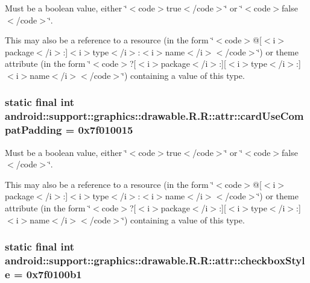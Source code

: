 Must be a boolean value, either \char`\"{}$<$code$>$true$<$/code$>$\char`\"{} or \char`\"{}$<$code$>$false$<$/code$>$\char`\"{}. 

This may also be a reference to a resource (in the form \char`\"{}$<$code$>$@\mbox{[}$<$i$>$package$<$/i$>$:\mbox{]}$<$i$>$type$<$/i$>$:$<$i$>$name$<$/i$>$$<$/code$>$\char`\"{}) or theme attribute (in the form \char`\"{}$<$code$>$?\mbox{[}$<$i$>$package$<$/i$>$:\mbox{]}\mbox{[}$<$i$>$type$<$/i$>$:\mbox{]}$<$i$>$name$<$/i$>$$<$/code$>$\char`\"{}) containing a value of this type. \hypertarget{classandroid_1_1support_1_1graphics_1_1drawable_1_1_r_1_1attr_37d1a1073e436afe463c3f31105a3f99}{
\subsubsection[{cardUseCompatPadding}]{\setlength{\rightskip}{0pt plus 5cm}static final int android::support::graphics::drawable.R.R::attr::cardUseCompatPadding = 0x7f010015}}
\label{classandroid_1_1support_1_1graphics_1_1drawable_1_1_r_1_1attr_37d1a1073e436afe463c3f31105a3f99}


Must be a boolean value, either \char`\"{}$<$code$>$true$<$/code$>$\char`\"{} or \char`\"{}$<$code$>$false$<$/code$>$\char`\"{}. 

This may also be a reference to a resource (in the form \char`\"{}$<$code$>$@\mbox{[}$<$i$>$package$<$/i$>$:\mbox{]}$<$i$>$type$<$/i$>$:$<$i$>$name$<$/i$>$$<$/code$>$\char`\"{}) or theme attribute (in the form \char`\"{}$<$code$>$?\mbox{[}$<$i$>$package$<$/i$>$:\mbox{]}\mbox{[}$<$i$>$type$<$/i$>$:\mbox{]}$<$i$>$name$<$/i$>$$<$/code$>$\char`\"{}) containing a value of this type. \hypertarget{classandroid_1_1support_1_1graphics_1_1drawable_1_1_r_1_1attr_e302941c85acc46cacc390f274386562}{
\subsubsection[{checkboxStyle}]{\setlength{\rightskip}{0pt plus 5cm}static final int android::support::graphics::drawable.R.R::attr::checkboxStyle = 0x7f0100b1}}
\label{classandroid_1_1support_1_1graphics_1_1drawable_1_1_r_1_1attr_e302941c85acc46cacc390f274386562}


